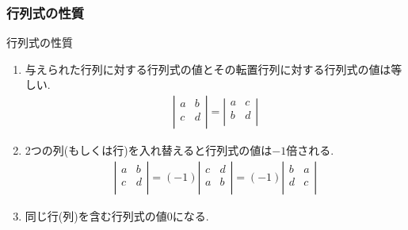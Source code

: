 \documentclass[a4paper]{jsarticle}
\begin{document}
\subsubsection{行列式の性質}
\begin{itembox}[l]{行列式の性質}
    \begin{enumerate}[(1)]
        \item 与えられた行列に対する行列式の値とその転置行列に対する行列式の値は等しい.
              \begin{eqnarray*}
                  \left| \begin{array}{rr}
                      a & b \\
                      c & d \\
                  \end{array} \right|
                  =
                  \left| \begin{array}{rr}
                      a & c \\
                      b & d \\
                  \end{array} \right|
              \end{eqnarray*}
        \item 2つの列(もしくは行)を入れ替えると行列式の値は$-1$倍される.
              \begin{eqnarray*}
                  \left| \begin{array}{rr}
                      a & b \\
                      c & d \\
                  \end{array} \right|
                  =(-1)
                  \left| \begin{array}{rr}
                      c & d \\
                      a & b \\
                  \end{array} \right|
                  =(-1)
                  \left| \begin{array}{rr}
                      b & a \\
                      d & c \\
                  \end{array} \right|
              \end{eqnarray*}
        \item 同じ行(列)を含む行列式の値$0$になる.
              \begin{eqnarray*}

\end{eqnarray*}
\end{enumerate}
\end{itembox}
\end{document}
